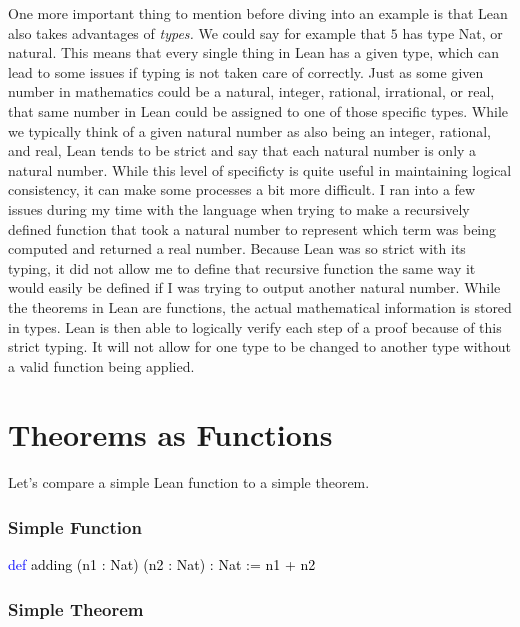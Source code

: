 \documentclass[
  letterpaper,
]{scrreprt}
\newenvironment{Shaded}{\begin{snugshade}}{\end{snugshade}}
\newcommand{\KeywordTok}[1]{\textcolor[rgb]{0.00,0.23,0.31}{#1}}
\newcommand{\NormalTok}[1]{\textcolor[rgb]{0.00,0.23,0.31}{#1}}
\renewcommand{\NormalTok}[1]{\textcolor[HTML]{000000}{#1}}
\renewcommand{\KeywordTok}[1]{\textcolor[HTML]{0000FF}{#1}}
\theoremstyle{remark}
\begin{document}
One more important thing to mention before diving into an example is
that Lean also takes advantages of \emph{types.} We could say for
example that \(5\) has type Nat, or natural. This means that every
single thing in Lean has a given type, which can lead to some issues if
typing is not taken care of correctly. Just as some given number in
mathematics could be a natural, integer, rational, irrational, or real,
that same number in Lean could be assigned to one of those specific
types. While we typically think of a given natural number as also being
an integer, rational, and real, Lean tends to be strict and say that
each natural number is only a natural number. While this level of
specificty is quite useful in maintaining logical consistency, it can
make some processes a bit more difficult. I ran into a few issues during
my time with the language when trying to make a recursively defined
function that took a natural number to represent which term was being
computed and returned a real number. Because Lean was so strict with its
typing, it did not allow me to define that recursive function the same
way it would easily be defined if I was trying to output another natural
number. While the theorems in Lean are functions, the actual
mathematical information is stored in types. Lean is then able to
logically verify each step of a proof because of this strict typing. It
will not allow for one type to be changed to another type without a
valid function being applied.

\hypertarget{theorems-as-functions}{%
\section{Theorems as Functions}\label{theorems-as-functions}}

Let's compare a simple Lean function to a simple theorem.

\hypertarget{simple-function}{%
\subsubsection{Simple Function}\label{simple-function}}

\begin{Shaded}
\begin{Highlighting}[]
\KeywordTok{def}\NormalTok{ adding (n1 : Nat) (n2 : Nat) : Nat := }
\NormalTok{  n1 + n2}
\end{Highlighting}
\end{Shaded}

\hypertarget{simple-theorem}{%
\subsubsection{Simple Theorem}\label{simple-theorem}}
\end{document}
